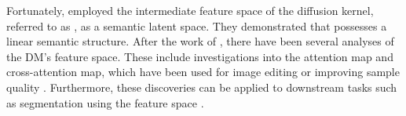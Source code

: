 Fortunately, \citet{kwon2022diffusion} employed the intermediate feature space of the diffusion kernel, referred to as \ehspace{}, as a semantic latent space. 
They demonstrated that \ehspace{} possesses a linear semantic structure.
{
    After the work of \citet{kwon2022diffusion}, there have been several analyses of the DM's feature space. These include investigations into the attention map and cross-attention map, which have been used for image editing \cite{hertz2022prompt, tumanyan2022plug, parmar2023zero} or improving sample quality \cite{chefer2023attend}. Furthermore, these discoveries can be applied to downstream tasks such as segmentation using the feature space \cite{ma2023diffusionseg, xu2023open}.
}


